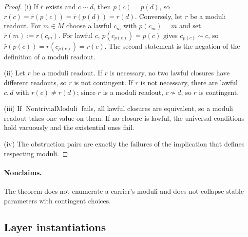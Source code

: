 \begin{proof}
(i) If \(\bar r\) exists and \(c\sim d\), then \(p(c)=p(d)\), so
\(r(c)=\bar r(p(c))=\bar r(p(d))=r(d)\). Conversely, let \(r\) be a moduli
readout. For \(m\in M\) choose a lawful \(c_m\) with \(p(c_m)=m\) and set
\(\bar r(m):=r(c_m)\). For lawful \(c\), \(p(c_{p(c)})=p(c)\) gives
\(c_{p(c)}\sim c\), so \(\bar r(p(c))=r(c_{p(c)})=r(c)\). The second
statement is the negation of the definition of a moduli readout.

(ii) Let \(r\) be a moduli readout. If \(r\) is necessary, no two lawful
closures have different readouts, so \(r\) is not contingent. If \(r\) is not
necessary, there are lawful \(c,d\) with \(r(c)\ne r(d)\); since \(r\) is a
moduli readout, \(c\not\sim d\), so \(r\) is contingent.

(iii) If \(\operatorname{NontrivialModuli}\) fails, all lawful closures are
equivalent, so a moduli readout takes one value on them. If no closure is
lawful, the universal conditions hold vacuously and the existential ones fail.

(iv) The obstruction pairs are exactly the failures of the implication that
defines respecting moduli.
\end{proof}

\paragraph{Nonclaims.} The theorem does not enumerate a carrier's moduli and does not
collapse stable parameters with contingent choices.

\subsection*{Layer instantiations}\label{layer-inst:F26}

